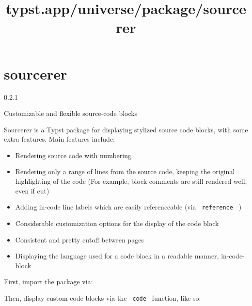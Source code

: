 \title{typst.app/universe/package/sourcerer}

\label{banner}
\section{sourcerer}\label{sourcerer}

{ 0.2.1 }

Customizable and flexible source-code blocks

\label{readme}
Sourcerer is a Typst package for displaying stylized source code blocks,
with some extra features. Main features include:

\begin{itemize}
\tightlist
\item
  Rendering source code with numbering
\item
  Rendering only a range of lines from the source code, keeping the
  original highlighting of the code (For example, block comments are
  still rendered well, even if cut)
\item
  Adding in-code line labels which are easily referenceable (via
  \texttt{\ reference\ } )
\item
  Considerable customization options for the display of the code block
\item
  Consistent and pretty cutoff between pages
\item
  Displaying the language used for a code block in a readable manner,
  in-code-block
\end{itemize}

First, import the package via:

\begin{Shaded}
\begin{Highlighting}[]
\end{Highlighting}
\end{Shaded}

Then, display custom code blocks via the \texttt{\ code\ } function,
like so:

\begin{Shaded}
\begin{Highlighting}[]
\NormalTok{  \textasciigrave{}\textasciigrave{}\textasciigrave{}}
\NormalTok{)}
\end{Highlighting}
\end{Shaded}

